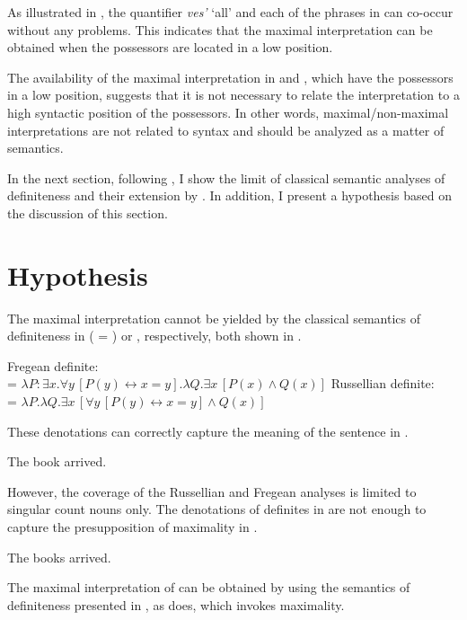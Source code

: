 \documentclass[output=paper,
colorlinks,
citecolor=brown,
newtxmath
]{langscibook}
\begin{document}
\noindent As illustrated in , the quantifier \textit{ves'} `all' and each of the phrases in  can co-occur without any problems. This indicates that the maximal interpretation can be obtained when the possessors are located in a low position.

The availability of the maximal interpretation in  and , which have the possessors in a low position, suggests that it is not necessary to relate the interpretation to a high syntactic position of the possessors. In other words, maximal/\hspace{0pt}non-maximal interpretations are not related to syntax and should be analyzed as a matter of semantics.

In the next section, following \citet{Heim2011}, I show the limit of classical semantic analyses of definiteness and their extension by \citet{Sharvy1980}. In addition, I present a hypothesis based on the discussion of this section.

\section{Hypothesis}\label{AN}

The maximal interpretation cannot be yielded by the classical semantics of definiteness in
\citeauthor{Frege1892} (\citeyear{Frege1892} = \citeyear{Frege1980}) or \citet{Russell1905}, respectively, both shown in .

\ea\label{CL}
\ea Fregean definite: \\
 = $\lambda P: \exists x . \forall y \, [P(y) \leftrightarrow x=y]. \lambda Q . \exists x \, [P(x) \wedge Q(x)]$
\ex Russellian definite: \\
 = $\lambda P . \lambda Q . \exists x \, [ \forall y \, [P(y) \leftrightarrow x=y] \wedge Q(x)]$
\z\z

\noindent These denotations can correctly capture the meaning of the sentence in .

\ea\label{DSG} The book arrived.
\z

\noindent However, the coverage of the Russellian and Fregean analyses is limited to singular count nouns only. The denotations of definites in  are not enough to capture the presupposition of maximality in .

\ea\label{DPL} The books arrived. \z

\noindent The maximal interpretation of  can be obtained by using the semantics of definiteness presented in , as \citet{Sharvy1980} does, which invokes maximality.
\end{document}
